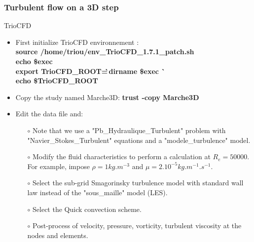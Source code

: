 \documentclass[10pt]{beamer}
\begin{document}
\begin{frame}
\frametitle{Turbulent flow on a 3D step}
\begin{block}{TrioCFD}

\begin{itemize}
\item First initialize TrioCFD environnement :\\
{\small{
\textbf{source /home/triou/env\_TrioCFD\_1.7.1\_patch.sh }\\
\textbf{echo \$exec} \\
\textbf{export TrioCFD\_ROOT=\`\,dirname \$exec \`} \\
\textbf{echo \$TrioCFD\_ROOT} \\
}}

\item Copy the study named Marche3D: 
\textbf{trust -copy Marche3D}

\item Edit the data file and: \\
    \begin{itemize}
    \item [$\circ$] Note that we use a "Pb\_Hydraulique\_Turbulent" problem with "Navier\_Stokes\_Turbulent" equations and a "modele\_turbulence" model.
    \item [$\circ$] Modify the fluid characteristics to perform a calculation at $R_e=50000$. For example, impose $\rho = 1 kg.m^{-3}$ and $\mu=2.10^{-5} kg.m^{-1}.s^{-1}$.
    \item [$\circ$] Select the sub-grid Smagorinsky turbulence model with standard wall law instead of the "sous\_maille" model (LES).
    \item [$\circ$] Select the Quick convection scheme.
    \item [$\circ$] Post-process of velocity, pressure, vorticity, turbulent viscosity at the nodes and elements.
    \end{itemize}

\end{itemize}

\end{block}
\end{frame}
\end{document}
